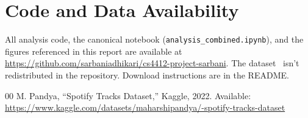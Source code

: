 \documentclass[10pt,twocolumn]{article}
\begin{document}
\section{Code and Data Availability}

All analysis code, the canonical notebook (\texttt{analysis\_combined.ipynb}), and the figures referenced in this report are available at \url{https://github.com/sarbaniadhikari/cs4412-project-sarbani}. The dataset~\cite{b1} isn't redistributed in the repository. Download instructions are in the README.

\begin{thebibliography}{00}
 M. Pandya, ``Spotify Tracks Dataset,'' Kaggle, 2022. Available: \url{https://www.kaggle.com/datasets/maharshipandya/-spotify-tracks-dataset}
\end{thebibliography}
\end{document}
